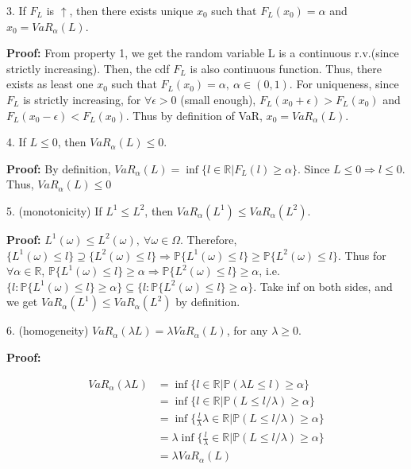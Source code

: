 \documentclass[letterpaper,11pt]{article}
\begin{document}
\begin{spacing}{1.2}
3. If $F_L$ is $\uparrow$, then there exists unique $x_0$ such that $F_L(x_0) = \alpha$ and $x_0 = VaR_\alpha(L)$.

\textbf{Proof:} From property 1, we get the random variable L is a continuous r.v.(since strictly increasing). Then, the cdf $F_L$ is also continuous function. Thus, there exists as least one $x_0$ such that $F_L(x_0) = \alpha, \ \alpha \in (0,1)$. For uniqueness, since $F_L$ is strictly increasing, for $\forall \epsilon > 0$ (small enough), $F_L(x_0+\epsilon) > F_L(x_0)$ and $F_L(x_0-\epsilon) < F_L(x_0)$. Thus by definition of VaR, $x_0 = VaR_{\alpha}(L)$.

4. If $L \le 0$, then $VaR_{\alpha}(L) \le 0$.

\textbf{Proof:} By definition, $VaR_{\alpha}(L) = \inf \{l \in \mathbb{R} | F_L(l) \ge \alpha\}$. Since $L \le 0 \Rightarrow l \le 0$. Thus, $VaR_{\alpha}(L) \le 0$

5. (monotonicity) If $L^1 \le L^2$, then $VaR_{\alpha}(L^1) \le VaR_{\alpha} (L^2)$.

\textbf{Proof:} $L^1(\omega) \le L^2(\omega), \ \forall \omega \in \Omega$. Therefore, $\{L^1(\omega) \le l\} \supseteq \{L^2(\omega) \le l\} \Rightarrow \mathbb{P}\{L^1(\omega) \le l\} \ge \mathbb{P}\{L^2(\omega) \le l\}$. Thus for $\forall \alpha \in \mathbb{R}$, $\mathbb{P}\{L^1(\omega) \le l\} \ge \alpha \Rightarrow \mathbb{P}\{L^2(\omega) \le l\} \ge \alpha$, i.e. $\{l: \mathbb{P}\{L^1(\omega) \le l\} \ge \alpha\} \subseteq \{l: \mathbb{P}\{L^2(\omega) \le l\} \ge \alpha\}$. Take inf on both sides, and we get $VaR_{\alpha}(L^1) \le VaR_{\alpha} (L^2)$ by definition.

6. (homogeneity) $VaR_{\alpha}(\lambda L) = \lambda VaR_{\alpha}(L)$, for any $\lambda \ge 0$.

\textbf{Proof:}

\begin{equation}
\begin{aligned}
VaR_{\alpha}(\lambda L) &= \inf \{l \in \mathbb{R} | \mathbb{P}(\lambda L \le l) \ge \alpha\} \\
&= \inf \{l \in \mathbb{R} | \mathbb{P}(L \le l/\lambda) \ge \alpha\} \\
&= \inf \{\frac{l}{\lambda} \lambda \in \mathbb{R} | \mathbb{P}(L \le l/\lambda) \ge \alpha\} \\
&= \lambda \inf \{\frac{l}{\lambda} \in \mathbb{R} | \mathbb{P}(L \le l/\lambda) \ge \alpha\} \\
&= \lambda VaR_{\alpha}(L)
\end{aligned}
\end{equation}


\end{spacing}
\end{document}
